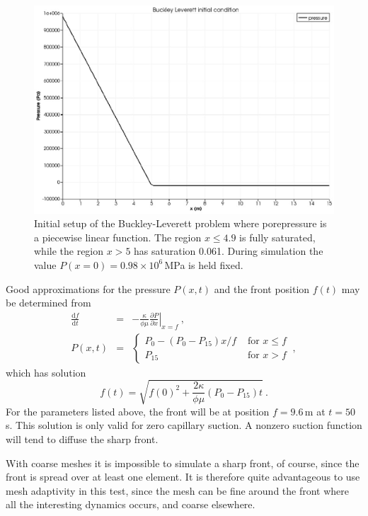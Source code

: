 \documentclass[]{scrreprt}
\begin{document}
\begin{figure}[htb]
\begin{center}
\includegraphics[width=12cm]{bl_initial.eps}
\caption{Initial setup of the Buckley-Leverett problem where
  porepressure is a piecewise linear function.  The region
$x\leq 4.9$ is fully saturated, while the region $x>5$ has saturation
  0.061.  During simulation the value $P(x=0)=0.98\times 10^{6}$\,MPa
  is held fixed.}
\label{bl_setup.figa}
\end{center}
\end{figure}

Good approximations for the pressure $P(x,t)$
and the front position $f(t)$ may be determined from
\begin{eqnarray}
\frac{{\mathrm d} f}{{\mathrm d} t} & = & -\frac{\kappa}{\phi\mu}
\left.\frac{\partial  P}{\partial x}\right|_{x = f} \ , \nonumber \\
P(x,t) & = & \left\{
\begin{array}{ll}
P_{0} - (P_{0}-P_{15})x/f & \mbox{ for } x\leq f  \\
P_{15} & \mbox{ for } x>f 
\end{array}
\right. \ ,
\label{eqn.predicted.bl.posn.eqna}
\end{eqnarray}
which has solution
\begin{equation}
f(t) = \sqrt{f(0)^{2} + \frac{2\kappa}{\phi\mu}(P_{0}-P_{15})t} \ .
\end{equation}
For the parameters listed above, the front will be at position
$f=9.6$\,m at $t=50$\,s.  This solution is only valid for zero
capillary suction.  A nonzero suction function will tend to diffuse
the sharp front.

With coarse meshes it is impossible to simulate a sharp front, of
course, since the front is spread over at least one element.  It is
therefore quite advantageous to use mesh adaptivity in this test,
since the mesh can be fine around the front where all the interesting
dynamics occurs, and coarse elsewhere.
\end{document}

